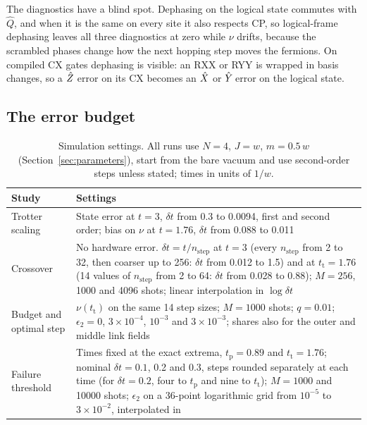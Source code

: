 The diagnostics have a blind spot. Dephasing on the logical state commutes
with $\hat Q$, and when it is the same on every site it also respects CP, so
logical-frame dephasing leaves all three diagnostics at zero while $\nu$ drifts,
because the scrambled phases change how the next hopping step moves the
fermions.
On compiled CX gates dephasing is visible: an RXX or RYY is wrapped in basis
changes, so a $\hat{Z}_{}$ error on its CX becomes an $\hat{X}_{}$ or $\hat{Y}_{}$ error on
the logical state.

\subsection{The error budget}
\label{sec:budget-method}

\begin{table}[tbp]
  \centering
  \caption{Simulation settings. All runs use $N = 4$, $J = w$, $m = 0.5\,w$
  (Section~\ref{sec:parameters}), start from the bare vacuum and use
  second-order steps unless stated; times in units of $1/w$.}
  \label{tab:params}
  \small
  \begin{tabular}{@{}>{\raggedright\arraybackslash}p{3.3cm}>{\raggedright\arraybackslash}p{12.2cm}@{}}
    \toprule
    Study & Settings \\
    \midrule
    Trotter scaling & State error at $t = 3$, $\delta t$ from 0.3 to 0.0094,
      first and second order; bias on $\nu$ at $t = 1.76$, $\delta t$ from 0.088 to 0.011 \\
    Crossover & No hardware error. $\delta t = t/n_{\mathrm{step}}$ at $t = 3$ (every $n_{\mathrm{step}}$ from 2 to 32,
      then coarser up to 256: $\delta t$ from 0.012 to 1.5) and at
      $t_{\mathrm{t}} = 1.76$ (14 values of $n_{\mathrm{step}}$ from 2 to 64: $\delta t$ from 0.028 to 0.88);
      $M = 256$, 1000 and 4096 shots; linear interpolation in $\log\delta t$ \\
    Budget and optimal step & $\nu(t_{\mathrm{t}})$ on the same 14 step sizes;
      $M = 1000$ shots; $q = 0.01$; $\epsilon_2 = 0$, $3\times10^{-4}$, $10^{-3}$ and
      $3\times10^{-3}$; shares also for the outer and middle link fields \\
    Failure threshold & Times fixed at the exact extrema, $t_{\mathrm{p}} = 0.89$ and
      $t_{\mathrm{t}} = 1.76$; nominal $\delta t = 0.1$, 0.2 and 0.3, steps rounded
      separately at each time (for $\delta t = 0.2$, four to $t_{\mathrm{p}}$ and nine
      to $t_{\mathrm{t}}$); $M = 1000$ and \num{10000} shots; $\epsilon_2$ on a 36-point
      logarithmic grid from $10^{-5}$ to $3\times10^{-2}$, interpolated in

\end{tabular}
\end{table}
